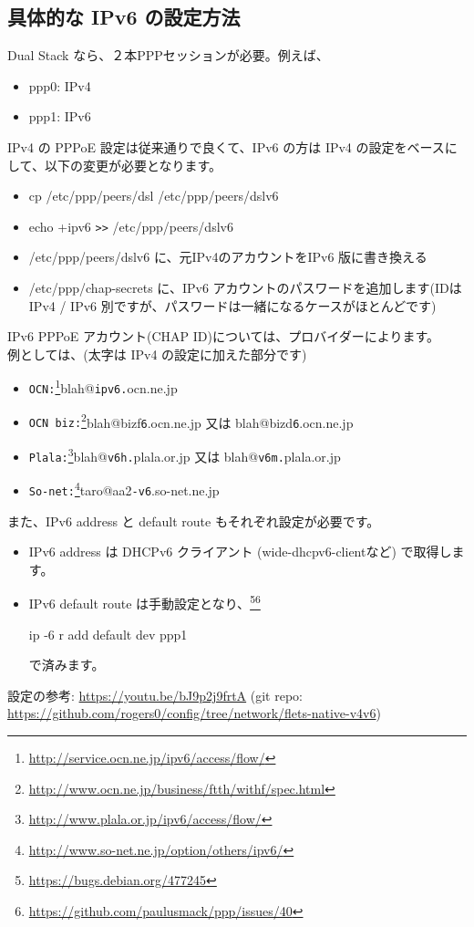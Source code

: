 \documentclass[mingoth,a4paper]{jsarticle}
\begin{document}
\subsection{具体的な IPv6 の設定方法}
Dual Stack なら、２本PPPセッションが必要。例えば、
\begin{itemize}
\item ppp0: IPv4
\item ppp1: IPv6
\end{itemize}
IPv4 の PPPoE 設定は従来通りで良くて、IPv6 の方は IPv4 の設定をベースにして、以下の変更が必要となります。
\begin{itemize}
\item cp /etc/ppp/peers/dsl /etc/ppp/peers/dslv6
\item echo +ipv6 \verb|>>| /etc/ppp/peers/dslv6
\item /etc/ppp/peers/dslv6 に、元IPv4のアカウントをIPv6 版に書き換える
\item /etc/ppp/chap-secrets に、IPv6 アカウントのパスワードを追加します(IDは IPv4 / IPv6 別ですが、パスワードは一緒になるケースがほとんどです)
\end{itemize}
IPv6 PPPoE アカウント(CHAP ID)については、プロバイダーによります。
\\例としては、(太字は IPv4 の設定に加えた部分です)
\begin{itemize}
\item {\tt OCN:}\footnote{\url{http://service.ocn.ne.jp/ipv6/access/flow/}}blah@\texttt{ipv6.}ocn.ne.jp
\item {\tt OCN biz:}\footnote{\url{http://www.ocn.ne.jp/business/ftth/withf/spec.html}}blah@bizf\texttt{6}.ocn.ne.jp 又は blah@bizd\texttt{6}.ocn.ne.jp
\item {\tt Plala:}\footnote{\url{http://www.plala.or.jp/ipv6/access/flow/}}blah@\texttt{v6h.}plala.or.jp 又は blah@\texttt{v6m.}plala.or.jp
\item {\tt So-net:}\footnote{\url{http://www.so-net.ne.jp/option/others/ipv6/}}taro@aa2\texttt{-v6}.so-net.ne.jp
\end{itemize}
また、IPv6 address と default route もそれぞれ設定が必要です。
\begin{itemize}
\item IPv6 address は DHCPv6 クライアント (wide-dhcpv6-clientなど) で取得します。
\item IPv6 default route は手動設定となり、\footnote{\url{https://bugs.debian.org/477245}}\footnote{\url{https://github.com/paulusmack/ppp/issues/40}}
\begin{commandline}
ip -6 r add default dev ppp1
\end{commandline}
で済みます。
\end{itemize}
設定の参考: \url{https://youtu.be/bJ9p2j9frtA}
(git repo: \url{https://github.com/rogers0/config/tree/network/flets-native-v4v6})
\end{document}
